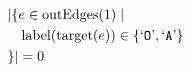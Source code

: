 \begin{align*}
&|\{e \in \mathrm{outEdges}(1)  \mid \\
&\quad \mathrm{label}(\mathrm{target}(e)) \in \{ \text{`\texttt{O}'},  \text{`\texttt{A}'} \}\\
&\}| = 0
\end{align*}

